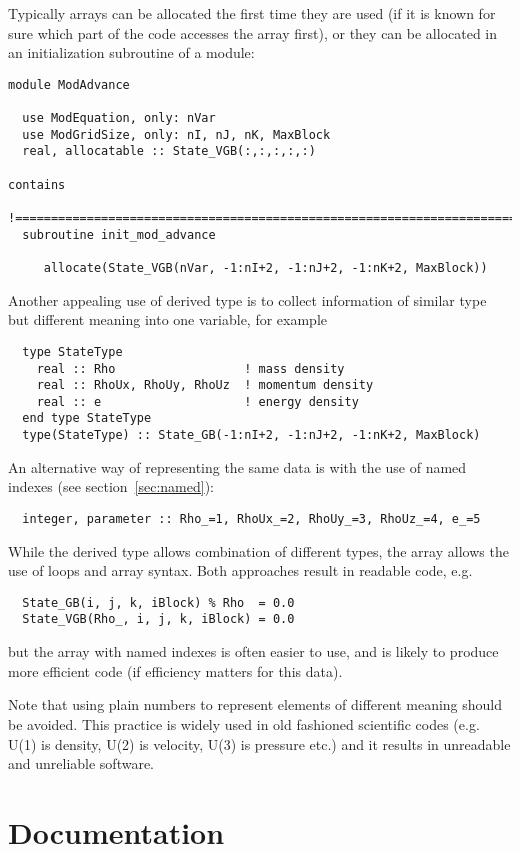 \documentclass{article}
\begin{document}
Typically arrays can be allocated the first time they are used (if it
is known for sure which part of the code accesses the array first),
or they can be allocated in an initialization subroutine of a module:
\begin{verbatim}
module ModAdvance

  use ModEquation, only: nVar
  use ModGridSize, only: nI, nJ, nK, MaxBlock
  real, allocatable :: State_VGB(:,:,:,:,:)

contains
  !========================================================================
  subroutine init_mod_advance

     allocate(State_VGB(nVar, -1:nI+2, -1:nJ+2, -1:nK+2, MaxBlock))
\end{verbatim}
Another appealing use of derived type is to collect information of
similar type but different meaning into one variable, for example
\begin{verbatim}
  type StateType
    real :: Rho                  ! mass density
    real :: RhoUx, RhoUy, RhoUz  ! momentum density
    real :: e                    ! energy density
  end type StateType
  type(StateType) :: State_GB(-1:nI+2, -1:nJ+2, -1:nK+2, MaxBlock)
\end{verbatim}
An alternative way of representing the
same data is with the use of named indexes (see section~\ref{sec:named}):
\begin{verbatim}
  integer, parameter :: Rho_=1, RhoUx_=2, RhoUy_=3, RhoUz_=4, e_=5
\end{verbatim}
While the derived type allows combination of different types, 
the array allows the use of loops and array syntax. Both approaches
result in readable code, e.g.
\begin{verbatim}
  State_GB(i, j, k, iBlock) % Rho  = 0.0
  State_VGB(Rho_, i, j, k, iBlock) = 0.0
\end{verbatim}
but the array with named indexes is often easier to use, and is likely
to produce more efficient code (if efficiency matters for this data).

Note that using plain numbers to represent elements of different meaning 
should be avoided. This practice is widely used in old fashioned scientific
codes (e.g. U(1) is density, U(2) is velocity, U(3) is pressure etc.)
and it results in unreadable and unreliable software.

\section{Documentation}
\end{document}
